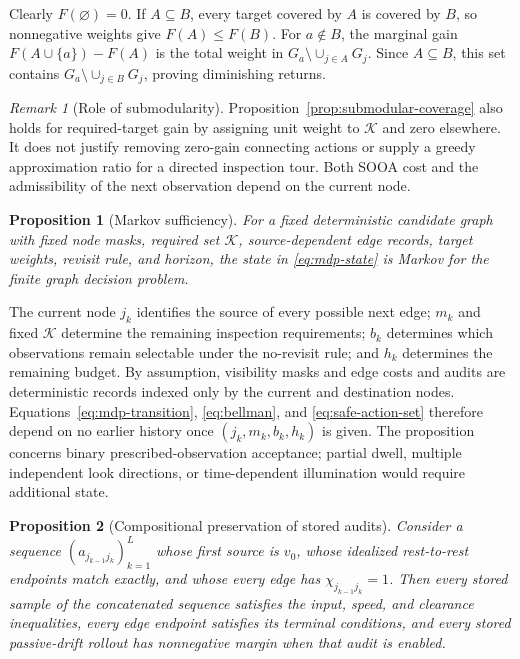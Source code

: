 \documentclass{IEEEtaes}
\newtheorem{proposition}{Proposition}
\theoremstyle{remark}
\newtheorem{remark}{Remark}
\theoremstyle{plain}
\begin{document}
\begin{IEEEproof}
Clearly $F(\varnothing)=0$. If $A\subseteq B$, every target covered by $A$ is covered by $B$, so nonnegative weights give $F(A)\le F(B)$. For $a\notin B$, the marginal gain $F(A\cup\{a\})-F(A)$ is the total weight in $G_a\setminus\cup_{j\in A}G_j$. Since $A\subseteq B$, this set contains $G_a\setminus\cup_{j\in B}G_j$, proving diminishing returns.
\end{IEEEproof}

\begin{remark}[Role of submodularity]
Proposition~\ref{prop:submodular-coverage} also holds for required-target gain by assigning unit weight to $\mathcal K$ and zero elsewhere. It does not justify removing zero-gain connecting actions or supply a greedy approximation ratio for a directed inspection tour. Both SOOA cost and the admissibility of the next observation depend on the current node.
\end{remark}

\begin{proposition}[Markov sufficiency]
\label{prop:markov-sufficiency}
For a fixed deterministic candidate graph with fixed node masks, required set $\mathcal K$, source-dependent edge records, target weights, revisit rule, and horizon, the state in \eqref{eq:mdp-state} is Markov for the finite graph decision problem.
\end{proposition}

\begin{IEEEproof}
The current node $j_k$ identifies the source of every possible next edge; $m_k$ and fixed $\mathcal K$ determine the remaining inspection requirements; $b_k$ determines which observations remain selectable under the no-revisit rule; and $h_k$ determines the remaining budget. By assumption, visibility masks and edge costs and audits are deterministic records indexed only by the current and destination nodes. Equations~\eqref{eq:mdp-transition}, \eqref{eq:bellman}, and \eqref{eq:safe-action-set} therefore depend on no earlier history once $(j_k,m_k,b_k,h_k)$ is given. The proposition concerns binary prescribed-observation acceptance; partial dwell, multiple independent look directions, or time-dependent illumination would require additional state.
\end{IEEEproof}

\begin{proposition}[Compositional preservation of stored audits]
\label{prop:audit-composition}
Consider a sequence $(a_{j_{k-1}j_k})_{k=1}^{L}$ whose first source is $v_0$, whose idealized rest-to-rest endpoints match exactly, and whose every edge has $\chi_{j_{k-1}j_k}=1$. Then every stored sample of the concatenated sequence satisfies the input, speed, and clearance inequalities, every edge endpoint satisfies its terminal conditions, and every stored passive-drift rollout has nonnegative margin when that audit is enabled.
\end{proposition}
\end{document}
